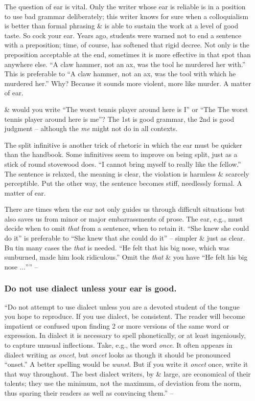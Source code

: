 \documentclass{article}
\begin{document}
The question of ear is vital. Only the writer whose ear is reliable is in a position to use bad grammar deliberately; this writer knows for sure when a colloquialism is better than formal phrasing \& is able to sustain the work at a level of good taste. So cock your ear. Years ago, students were warned not to end a sentence with a preposition; time, of course, has softened that rigid decree. Not only is the preposition acceptable at the end, sometimes it is more effective in that spot than anywhere else. ``A claw hammer, not an ax, was the tool he murdered her with.'' This is preferable to ``A claw hammer, not an ax, was the tool with which he murdered her.'' Why? Because it sounds more violent, more like murder. A matter of ear.

\& would you write ``The worst tennis player around here is I'' or ``The The worst tennis player around here is me''? The 1st is good grammar, the 2nd is good judgment -- although the {\it me} might not do in all contexts.

The split infinitive is another trick of rhetoric in which the ear must be quicker than the handbook. Some infinitives seem to improve on being split, just as a stick of round stovewood does. ``I cannot bring myself to really like the fellow.'' The sentence is relaxed, the meaning is clear, the violation is harmless \& scarcely perceptible. Put the other way, the sentence becomes stiff, needlessly formal. A matter of ear.

There are times when the ear not only guides us through difficult situations but also saves us from minor or major embarrassments of prose. The ear, e.g., must decide when to omit {\it that} from a sentence, when to retain it. ``She knew she could do it'' is preferable to ``She knew that she could do it'' -- simpler \& just as clear. Bu tin many cases the {\it that} is needed. ``He felt that his big nose, which was sunburned, made him look ridiculous.'' Omit the {\it that} \& you have ``He felt his big nose $\ldots$'''' -- \cite[p. 93]{Strunk_White_element_style}


\subsubsection{Do not use dialect unless your ear is good.}
``Do not attempt to use dialect unless you are a devoted student of the tongue you hope to reproduce. If you use dialect, be consistent. The reader will become impatient or confused upon finding 2 or more versions of the same word or expression. In dialect it is necessary to spell phonetically, or at least ingeniously, to capture unusual inflections. Take, e.g., the word {\it once}. It often appears in dialect writing as {\it oncet}, but {\it oncet} looks as though it should be pronounced ``onset.'' A better spelling would be {\it wunst}. But if you write it {\it oncet} once, write it that way throughout. The best dialect writers, by \& large, are economical of their talents; they use the minimum, not the maximum, of deviation from the norm, thus sparing their readers as well as convincing them.'' -- \cite[p. 94]{Strunk_White_element_style}
\end{document}

